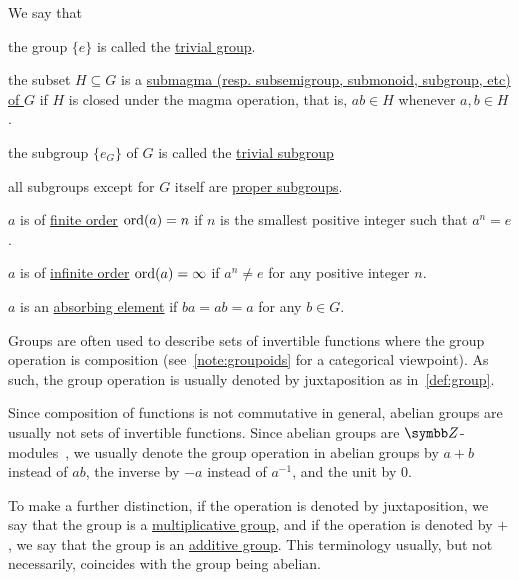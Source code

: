 \begin{definition}
  We say that
  \begin{defenum}
    \item\label{def:group/trivial_group} the group $\{ e \}$ is called the \ul{trivial group}.
    \item\label{def:group/subgroup} the subset $H \subseteq G$ is a \ul{submagma (resp. subsemigroup, submonoid, subgroup, etc) of $G$} if $H$ is closed under the magma operation, that is, $ab \in H$ whenever $a, b \in H$.
    \item\label{def:group/trivial_subgroup} the subgroup $\{ e_G \}$ of $G$ is called the \ul{trivial subgroup}
    \item\label{def:group/proper_subgroup} all subgroups except for $G$ itself are \ul{proper subgroups}.
    \item\label{def:group/finite_order} $a$ is of \ul{finite order} $\operatorname{ord}(a) = n$ if $n$ is the smallest positive integer such that $a^n = e$.
    \item\label{def:group/infinite_order} $a$ is of \ul{infinite order} $\operatorname{ord}(a) = \infty$ if $a^n \neq e$ for any positive integer $n$.
    \item\label{def:group/absorbing_element} $a$ is an \ul{absorbing element} if $ba = ab = a$ for any $b \in G$.
  \end{defenum}
\end{definition}

\begin{note}\label{note:additive_group}
  Groups are often used to describe sets of invertible functions where the group operation is composition (see~\cref{note:groupoids} for a categorical viewpoint). As such, the group operation is usually denoted by juxtaposition as in~\cref{def:group}.

  Since composition of functions is not commutative in general, abelian groups are usually not sets of invertible functions. Since abelian groups are $\BB{Z}$-modules~, we usually denote the group operation in abelian groups by $a + b$ instead of $ab$, the inverse by $-a$ instead of $a^{-1}$, and the unit by $0$.

  To make a further distinction, if the operation is denoted by juxtaposition, we say that the group is a \ul{multiplicative group}, and if the operation is denoted by $+$, we say that the group is an \ul{additive group}. This terminology usually, but not necessarily, coincides with the group being abelian.
\end{note}


